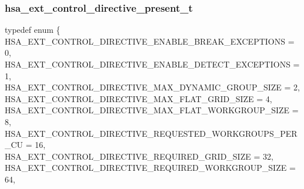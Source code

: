 \documentclass[final,oneside]{book}
\newcommand{\reftyp}[1]{#1}
\newcommand{\refenu}[1]{\reftyp{#1}}
\newenvironment{mylongtable}{\rowcolors{0}{lightgray}{lightgray}\longtable} {
\endlongtable}
\begin{document}
\subsubsection{hsa_\-ext_\-control_\-directive_\-present_\-t}
\vspace{-5.5mm}\begin{mylongtable}{@{}p{\textwidth}}
\rule{0pt}{3ex}typedef enum \{\\\hspace{1.7em}\hypertarget{group__ext-finalizer_1gga143d9e622dfd7889d52fb5eb5ed1ffdba1c209f3a9fd22b358006c221303f8893}{\refenu{HSA_\-EXT_\-CONTROL_\-DIRECTIVE_\-ENABLE_\-BREAK_\-EXCEPTIONS}} = 0,\\
\hspace{1.7em}\hypertarget{group__ext-finalizer_1gga143d9e622dfd7889d52fb5eb5ed1ffdba5f6e061c9abd08976ee6f4c4ee48f30a}{\refenu{HSA_\-EXT_\-CONTROL_\-DIRECTIVE_\-ENABLE_\-DETECT_\-EXCEPTIONS}} = 1,\\
\hspace{1.7em}\hypertarget{group__ext-finalizer_1gga143d9e622dfd7889d52fb5eb5ed1ffdba7787b99c887699ca6fe8d1cd4de3477e}{\refenu{HSA_\-EXT_\-CONTROL_\-DIRECTIVE_\-MAX_\-DYNAMIC_\-GROUP_\-SIZE}} = 2,\\
\hspace{1.7em}\hypertarget{group__ext-finalizer_1gga143d9e622dfd7889d52fb5eb5ed1ffdba8f84c9f5303be293df76bf82b002299c}{\refenu{HSA_\-EXT_\-CONTROL_\-DIRECTIVE_\-MAX_\-FLAT_\-GRID_\-SIZE}} = 4,\\
\hspace{1.7em}\hypertarget{group__ext-finalizer_1gga143d9e622dfd7889d52fb5eb5ed1ffdbaa0e6d7d860284c6cadde5c7e9db66968}{\refenu{HSA_\-EXT_\-CONTROL_\-DIRECTIVE_\-MAX_\-FLAT_\-WORKGROUP_\-SIZE}} = 8,\\
\hspace{1.7em}\hypertarget{group__ext-finalizer_1gga143d9e622dfd7889d52fb5eb5ed1ffdbae6659470b66232e7ec4a749a032dc95d}{\refenu{HSA_\-EXT_\-CONTROL_\-DIRECTIVE_\-REQUESTED_\-WORKGROUPS_\-PER_\-CU}} = 16,\\
\hspace{1.7em}\hypertarget{group__ext-finalizer_1gga143d9e622dfd7889d52fb5eb5ed1ffdbaa9878485a06df4090cba80c85acb32be}{\refenu{HSA_\-EXT_\-CONTROL_\-DIRECTIVE_\-REQUIRED_\-GRID_\-SIZE}} = 32,\\
\hspace{1.7em}\hypertarget{group__ext-finalizer_1gga143d9e622dfd7889d52fb5eb5ed1ffdbab26301028f39a1ac099aae9e74251438}{\refenu{HSA_\-EXT_\-CONTROL_\-DIRECTIVE_\-REQUIRED_\-WORKGROUP_\-SIZE}} = 64,\\

\end{mylongtable}
\end{document}
